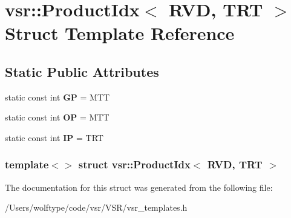 \hypertarget{structvsr_1_1_product_idx_3_01_r_v_d_00_01_t_r_t_01_4}{\section{vsr\-:\-:Product\-Idx$<$ R\-V\-D, T\-R\-T $>$ Struct Template Reference}
\label{structvsr_1_1_product_idx_3_01_r_v_d_00_01_t_r_t_01_4}
}
\subsection*{Static Public Attributes}
\begin{DoxyCompactItemize}
\item 
\hypertarget{structvsr_1_1_product_idx_3_01_r_v_d_00_01_t_r_t_01_4_a564ffbf9d4a2384e9870b43162c5afff}{static const int {\bfseries G\-P} = M\-T\-T}\label{structvsr_1_1_product_idx_3_01_r_v_d_00_01_t_r_t_01_4_a564ffbf9d4a2384e9870b43162c5afff}

\item 
\hypertarget{structvsr_1_1_product_idx_3_01_r_v_d_00_01_t_r_t_01_4_a12ad81b09f839cc6db0af21d325dc8e1}{static const int {\bfseries O\-P} = M\-T\-T}\label{structvsr_1_1_product_idx_3_01_r_v_d_00_01_t_r_t_01_4_a12ad81b09f839cc6db0af21d325dc8e1}

\item 
\hypertarget{structvsr_1_1_product_idx_3_01_r_v_d_00_01_t_r_t_01_4_ace07ae36022532c3d5fe0cfdd24c8bff}{static const int {\bfseries I\-P} = T\-R\-T}\label{structvsr_1_1_product_idx_3_01_r_v_d_00_01_t_r_t_01_4_ace07ae36022532c3d5fe0cfdd24c8bff}

\end{DoxyCompactItemize}
\subsubsection*{template$<$$>$ struct vsr\-::\-Product\-Idx$<$ R\-V\-D, T\-R\-T $>$}



The documentation for this struct was generated from the following file\-:\begin{DoxyCompactItemize}
\item 
/\-Users/wolftype/code/vsr/\-V\-S\-R/vsr\-\_\-templates.\-h\end{DoxyCompactItemize}
